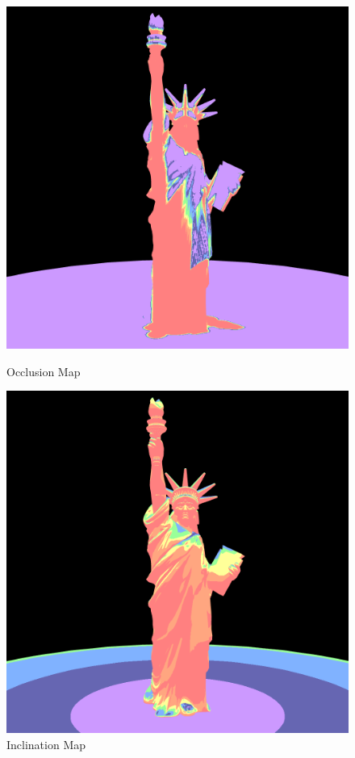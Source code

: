 \documentclass{article}
\begin{document}
\begin{figure}[h]
  \centering
  \begin{minipage}{0.45\textwidth}
      \centering
      \includegraphics[width=\textwidth]{images/OcclusionMap.png}
      \caption{Occlusion Map}
      \label{fig:OcclusionMap}
  \end{minipage}\hfill
  \begin{minipage}{0.45\textwidth}
      \centering
      \includegraphics[width=\textwidth]{images/InclinationMap.png}
      \caption{Inclination Map}
      \label{fig:InclinationMap}
  \end{minipage}
\end{figure}
\end{document}
